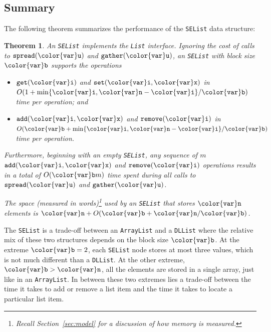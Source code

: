\documentclass[10pt]{book}
\newcommand{\secref}[1]{Section~\ref{sec:#1}}
\theoremstyle{plain}
\newtheorem{thm}{Theorem}[chapter]
\newcommand{\thmlabel}[1]{\label{thm:#1}}
\theoremstyle{definition}
\begin{document}
\subsection{Summary}

The following theorem summarizes the performance of the \texttt{SEList} data
structure:

\begin{thm}\thmlabel{selist}
  An \texttt{SEList} implements the \texttt{List} interface.  Ignoring the cost of
  calls to \ensuremath{\mathtt{spread({\color{var}u})}} and \ensuremath{\mathtt{gather({\color{var}u})}}, an \texttt{SEList} with block size \ensuremath{\mathtt{{\color{var}b}}}
  supports the operations
  \begin{itemize}
    \item \ensuremath{\mathtt{get({\color{var}i})}} and \ensuremath{\mathtt{set({\color{var}i},{\color{var}x})}} in $O(1+\min\{\ensuremath{\mathtt{{\color{var}i}}},\ensuremath{\mathtt{{\color{var}n}}}-\ensuremath{\mathtt{{\color{var}i}}}\}/\ensuremath{\mathtt{{\color{var}b}}})$ time per operation; and
    \item \ensuremath{\mathtt{add({\color{var}i},{\color{var}x})}} and \ensuremath{\mathtt{remove({\color{var}i})}} in $O(\ensuremath{\mathtt{{\color{var}b}}}+\min\{\ensuremath{\mathtt{{\color{var}i}}},\ensuremath{\mathtt{{\color{var}n}}}-\ensuremath{\mathtt{{\color{var}i}}}\}/\ensuremath{\mathtt{{\color{var}b}}})$ time per operation.
  \end{itemize}
  Furthermore, beginning with an empty \texttt{SEList}, any sequence of $m$
  \ensuremath{\mathtt{add({\color{var}i},{\color{var}x})}} and \ensuremath{\mathtt{remove({\color{var}i})}} operations results in a total of $O(\ensuremath{\mathtt{{\color{var}b}}}m)$
  time spent during all calls to \ensuremath{\mathtt{spread({\color{var}u})}} and \ensuremath{\mathtt{gather({\color{var}u})}}.

  The space (measured in words)\footnote{Recall \secref{model} for a
  discussion of how memory is measured.} used by an \texttt{SEList}
  that stores \ensuremath{\mathtt{{\color{var}n}}} elements is $\ensuremath{\mathtt{{\color{var}n}}} +O(\ensuremath{\mathtt{{\color{var}b}}} + \ensuremath{\mathtt{{\color{var}n}}}/\ensuremath{\mathtt{{\color{var}b}}})$.
\end{thm}

The \texttt{SEList} is a trade-off between an \texttt{ArrayList} and a \texttt{DLList} where
the relative mix of these two structures depends on the block size \ensuremath{\mathtt{{\color{var}b}}}.
At the extreme $\ensuremath{\mathtt{{\color{var}b}}}=2$, each \texttt{SEList} node stores at most three values,
which is not much different than a \texttt{DLList}. At the other extreme,
$\ensuremath{\mathtt{{\color{var}b}}}>\ensuremath{\mathtt{{\color{var}n}}}$, all the elements are stored in a single array, just like in
an \texttt{ArrayList}.  In between these two extremes lies a trade-off between
the time it takes to add or remove a list item and the time it takes to
locate a particular list item.
\end{document}
